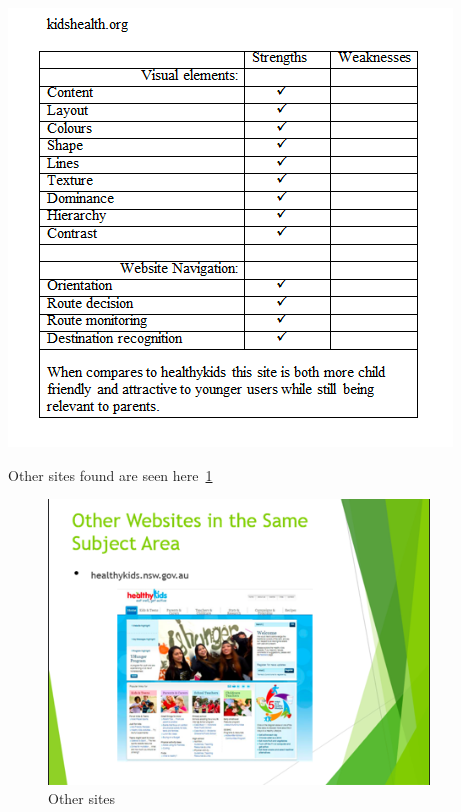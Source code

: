 \documentclass[letterpaper,12pt]{article}
\begin{document}
\includegraphics{assets/jpg/tab3}

Other sites found are seen here~\cref{fig:othersites}


\begin{figure}[ht!]
  \centering
  \includegraphics[width=0.9\textwidth]{assets/jpg/othersite_1}
  \caption{Other sites}
  \label{fig:othersites}
\end{figure}
\FloatBarrier
\end{document}
